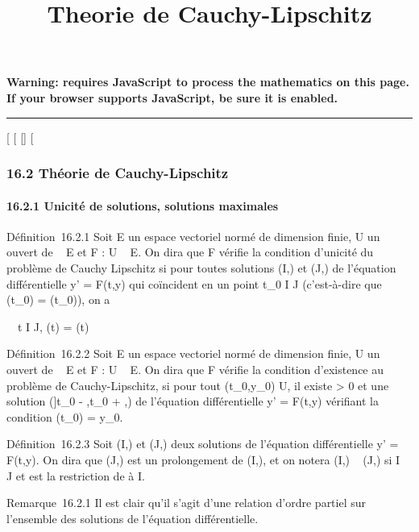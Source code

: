 \documentclass[]{article}
\title{Theorie de Cauchy-Lipschitz}
\author{}
\date{}
\begin{document}
\maketitle

\textbf{Warning: 
requires JavaScript to process the mathematics on this page.\\ If your
browser supports JavaScript, be sure it is enabled.}

\begin{center}\rule{3in}{0.4pt}\end{center}

{[}
{[}
{[}{]}
{[}

\subsubsection{16.2 Théorie de Cauchy-Lipschitz}

\paragraph{16.2.1 Unicité de solutions, solutions maximales}

Définition~16.2.1 Soit E un espace vectoriel normé de dimension finie, U
un ouvert de ~ \times E et F : U \rightarrow~ E. On dira que F vérifie la condition
d'unicité du problème de Cauchy Lipschitz si pour toutes solutions (I,\phi)
et (J,\psi) de l'équation différentielle y' = F(t,y) qui coïncident en un
point t_0 \in I \bigcap J (c'est-à-dire que \phi(t_0) =
\psi(t_0)), on a

\forall~~t \in I \bigcap J, \phi(t) = \psi(t)

Définition~16.2.2 Soit E un espace vectoriel normé de dimension finie, U
un ouvert de ~ \times E et F : U \rightarrow~ E. On dira que F vérifie la condition
d'existence au problème de Cauchy-Lipschitz, si pour tout
(t_0,y_0) \in U, il existe \eta \textgreater{} 0 et une
solution ({]}t_0 - \eta,t_0 + \eta{[},\phi) de l'équation
différentielle y' = F(t,y) vérifiant la condition \phi(t_0) =
y_0.

Définition~16.2.3 Soit (I,\phi) et (J,\psi) deux solutions de l'équation
différentielle y' = F(t,y). On dira que (J,\psi) est un prolongement de
(I,\phi), et on notera (I,\phi) \prec~ (J,\psi) si I \subset~ J et \phi est la restriction de \psi
à I.

Remarque~16.2.1 Il est clair qu'il s'agit d'une relation d'ordre partiel
sur l'ensemble des solutions de l'équation différentielle.
\end{document}
